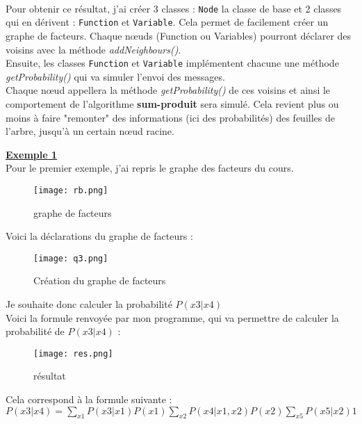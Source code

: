 \documentclass[12pt]{article}
\begin{document}
\paragraph{}
Pour obtenir ce résultat, j'ai créer 3 classes : \texttt{Node} la classe de base et 2 classes qui en dérivent : \texttt{Function} et \texttt{Variable}. Cela permet de facilement créer un graphe de facteurs. Chaque nœuds (Function ou Variables) pourront déclarer des voisins avec la méthode \textit{addNeighbours()}. \\
Ensuite, les classes \texttt{Function} et \texttt{Variable} implémentent chacune une méthode \textit{getProbability()} qui va simuler l'envoi des messages. \\
Chaque nœud appellera la méthode \textit{getProbability()} de ces voisins et ainsi le comportement de l'algorithme \textbf{sum-produit} sera simulé. Cela revient plus ou moins à faire "remonter" des informations (ici des probabilités) des feuilles de l'arbre, jusqu'à un certain nœud racine.
\\ \linebreak

\textbf{\underline{Exemple 1}}
\\
Pour le premier exemple, j'ai repris le graphe des facteurs du cours.
\begin{figure}[H]
\begin{center}
  \texttt{[image: rb.png]}
  \caption{graphe de facteurs}
\end{center}
\end{figure}
Voici la déclarations du graphe de facteurs : 
\\
\begin{figure}[H]
\begin{center}
  \texttt{[image: q3.png]}
  \caption{Création du graphe de facteurs}
  \label{fig:Exemple}
\end{center}
\end{figure}
Je souhaite donc calculer la probabilité $ P(x3 | x4) $ \\
Voici la formule renvoyée par mon programme, qui va permettre de calculer la probabilité de $P(x3|x4)$ :
\begin{figure}[H]
\begin{center}
  \texttt{[image: res.png]}
  \caption{résultat}
\end{center}
\end{figure}
Cela correspond à la formule suivante : \\ 
$P(x3|x4) = \sum_{x1} P(x3|x1) P(x1) \sum_{x2} P(x4|x1, x2) P(x2) \sum_{x5} P(x5|x2) 1 $
\end{document}
